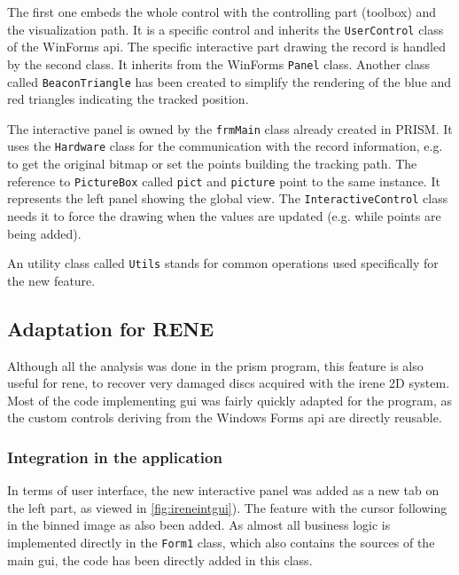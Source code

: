 The first one embeds the whole control with the controlling part (toolbox) and the visualization path. It is a specific control and inherits the \texttt{UserControl} class of the WinForms \gls{api}. The specific interactive part drawing the record is handled by the second class. It inherits from the WinForms \texttt{Panel} class. Another class called \texttt{BeaconTriangle} has been created to simplify the rendering of the blue and red triangles indicating the tracked position.

The interactive panel is owned by the \texttt{frmMain} class already created in PRISM. It uses the \texttt{Hardware} class for the communication with the record information, e.g. to get the original bitmap or set the points building the tracking path. The reference to \texttt{PictureBox} called \texttt{pict} and \texttt{picture} point to the same instance. It represents the left panel showing the global view. The \texttt{InteractiveControl} class needs it to force the drawing when the values are updated (e.g. while points are being added).

An utility class called \texttt{Utils} stands for common operations used specifically for the new feature.

\subsection{Adaptation for RENE}

Although all the analysis was done in the \gls{prism} program, this feature is also useful for \gls{rene}, to recover very damaged discs acquired with the \gls{irene} 2D system. Most of the code implementing \gls{gui} was fairly quickly adapted for the program, as the custom controls deriving from the Windows Forms \gls{api} are directly reusable.

\subsubsection{Integration in the application}

In terms of user interface, the new interactive panel was added as a new tab on the left part, as viewed in \autoref{fig:ireneintgui}). The feature with the cursor following in the binned image as also been added. As almost all business logic is implemented directly in the \texttt{Form1} class, which also contains the sources of the main \gls{gui}, the code has been directly added in this class.

